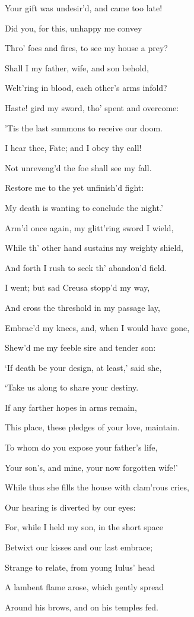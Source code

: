 Your gift was undesir’d, and came too late!

Did you, for this, unhappy me convey

Thro’ foes and fires, to see my house a prey?

Shall I my father, wife, and son behold,

Welt’ring in blood, each other’s arms infold?

Haste! gird my sword, tho’ spent and overcome:

’Tis the last summons to receive our doom.

I hear thee, Fate; and I obey thy call!

Not unreveng’d the foe shall see my fall.

Restore me to the yet unfinish’d fight:

My death is wanting to conclude the night.’

Arm’d once again, my glitt’ring sword I wield,

While th’ other hand sustains my weighty shield,

And forth I rush to seek th’ abandon’d field.

I went; but sad Creusa stopp’d my way,

And cross the threshold in my passage lay,

Embrac’d my knees, and, when I would have gone,

Shew’d me my feeble sire and tender son:

‘If death be your design, at least,’ said she,

‘Take us along to share your destiny.

If any farther hopes in arms remain,

This place, these pledges of your love, maintain.

To whom do you expose your father’s life,

Your son’s, and mine, your now forgotten wife!’

While thus she fills the house with clam’rous cries,

Our hearing is diverted by our eyes:

For, while I held my son, in the short space

Betwixt our kisses and our last embrace;

Strange to relate, from young Iulus’ head

A lambent flame arose, which gently spread

Around his brows, and on his temples fed.

